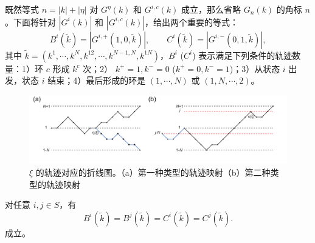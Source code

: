 既然等式 $n=|k|+|\eta|$ 对 $G^{\eta}(k)$ 和 $G^{i,c}(k)$ 成立，那么省略 $G_n(k)$ 的角标 $n$。下面将针对 $|G^i(k)|$ 和 $|G^{i,c}(k)|$，给出两个重要的等式：
\begin{equation*}
	B^i(\tilde{k})=\left|G^{i,+}(1,0,\tilde{k})\right|,\qquad	C^i(\tilde{k})=\left|G^{i,-}(0,1,\tilde{k})\right|,
\end{equation*}
其中 $\tilde{k}=(k^1,\cdots,k^N,k^{12},\cdots,k^{N-1,N},k^{1N})$，$B^i$ ($C^i$) 表示满足下列条件的轨迹数量：1）环 $c$ 形成 $k^c$ 次；2） $k^+=1,k^-=0$ ($k^+=0,k^-=1$)；3）从状态 $i$ 出发，状态 $i$ 结束；4）最后形成的环是 $(1,\cdots,N)$ 或 $(1,N,\cdots,2)$。

\begin{figure}[h]
	\centering
	\includegraphics[scale=0.7]{chart/brokenlinegraph.pdf}
	\caption{$\xi$ 的轨迹对应的折线图。（a）第一种类型的轨迹映射（b）第二种类型的轨迹映射}
	\label{fig:linechart}
\end{figure}
\begin{lemma}\label{lemma:BiBjCiCj}
	对任意 $i,j\in S$，有
	\begin{equation*}
		B^i\left(\tilde{k}\right)=B^j\left(\tilde{k}\right)=C^i\left(\tilde{k}\right)=C^j\left(\tilde{k}\right).
	\end{equation*}
	成立。
\end{lemma}

